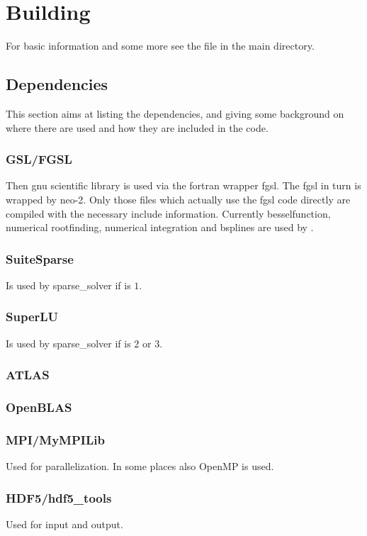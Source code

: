 \chapter{Building}
For basic information and some more see the file  in the
\neotwo main directory.

\section{Dependencies}
This section aims at listing the dependencies, and giving some
background on where there are used and how they are included in the
code.

\subsection{GSL/FGSL}
Then gnu scientific library is used via the fortran wrapper fgsl. The
fgsl in turn is wrapped by neo-2. Only those files which actually use
the fgsl code directly are compiled with the necessary include
information.
Currently besselfunction, numerical rootfinding, numerical integration
and bsplines are used by \neotwo.

\subsection{SuiteSparse}
Is used by sparse\_solver if  is $1$.

\subsection{SuperLU}
Is used by sparse\_solver if  is
$2$ or $3$.

\subsection{ATLAS}

\subsection{OpenBLAS}

\subsection{MPI/MyMPILib}
Used for parallelization. In some places also OpenMP is used.

\subsection{HDF5/hdf5\_tools}
Used for input and output.
